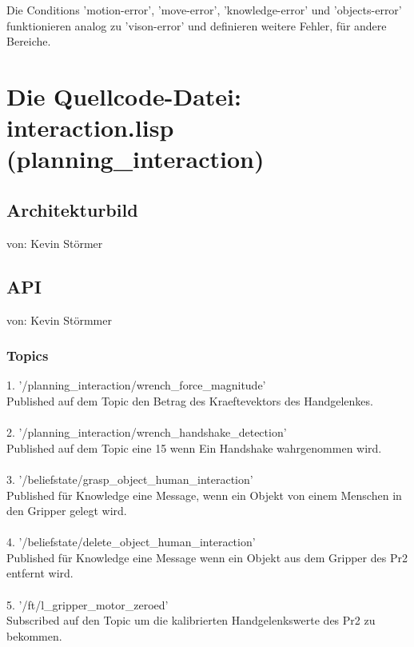 \documentclass{suturo}
\makeatletter
\newcommand{\chapterauthor}[1]{%
  {\parindent0pt\vspace*{-27pt}%
  \linespread{0}\small\begin{flushright}von: #1\end{flushright}%
  \par\nobreak\vspace*{0pt}}
  \@afterheading%
}
\makeatother
\begin{document}
Die Conditions 'motion-error', 'move-error', 'knowledge-error' und 'objects-error' funktionieren analog zu 'vison-error' und definieren weitere Fehler, für andere Bereiche.
\section{Die Quellcode-Datei: interaction.lisp (planning\_interaction)}
\subsection{Architekturbild}
\chapterauthor{Kevin Störmer}



\begin{figure}[!htb]
\end{figure}



\subsection{API}
\chapterauthor{Kevin Störmmer}
\subsubsection{Topics}
1. '/planning\_interaction/wrench\_force\_magnitude' \\
Published auf dem Topic den Betrag des Kraeftevektors des Handgelenkes.\\ \\
2. '/planning\_interaction/wrench\_handshake\_detection' \\
Published auf dem Topic eine 15 wenn Ein Handshake wahrgenommen wird.\\ \\
3. '/beliefstate/grasp\_object\_human\_interaction' \\
Published für Knowledge eine Message, wenn ein Objekt von einem Menschen in den Gripper gelegt wird.\\ \\
4. '/beliefstate/delete\_object\_human\_interaction' \\
Published für Knowledge eine Message wenn ein Objekt aus dem Gripper des Pr2 entfernt wird.\\ \\
5. '/ft/l\_gripper\_motor\_zeroed' \\
Subscribed auf den Topic um die kalibrierten Handgelenkswerte des Pr2 zu bekommen.\\ \\
\end{document}
